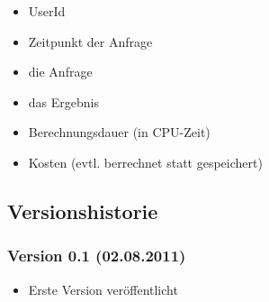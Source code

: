 \documentclass[ngerman]{scrartcl}
\begin{document}
	\begin{itemize}
		\item UserId
		\item Zeitpunkt der Anfrage
		\item die Anfrage
		\item das Ergebnis
		\item Berechnungsdauer (in CPU-Zeit)
		\item Kosten (evtl. berrechnet statt gespeichert)
	\end{itemize}	

	\subsection{Versionshistorie}
	
	\subsubsection*{Version 0.1 (02.08.2011)}

	\begin{itemize}
		\item Erste Version veröffentlicht
	\end{itemize}
\end{document}
